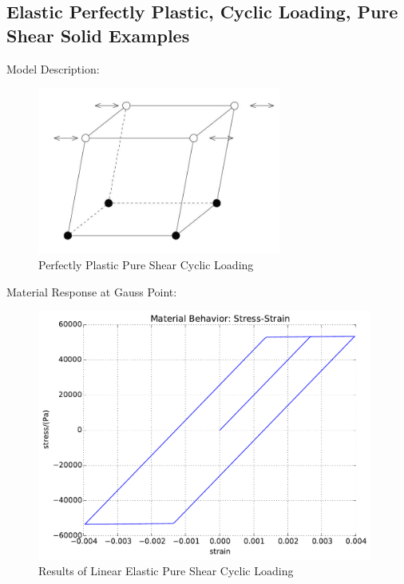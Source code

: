 \documentclass[fleqn,11pt]{article}
\begin{document}
\subsection{Elastic Perfectly Plastic, Cyclic Loading, Pure Shear Solid Examples}

Model Description:

\begin{figure}[H]
\begin{center}
\includegraphics[width=8cm]{../Figure-files/shear_cyclic_brick.JPG}
\caption{
\label{Perfectly Plastic Pure Shear Cyclic Loadin}
Perfectly Plastic Pure Shear Cyclic Loading}
\end{center}
\end{figure}

Material Response at Gauss Point:

\begin{figure}[H]
\begin{center}
\includegraphics[width=11cm]{../fei_examples/perfectly_plastic_pure_shear_solid/2pure_shear_cyclic_loading/result.pdf}
\caption{
\label{Results of Linear Elastic Pure Shear Cyclic Loadin}
Results of Linear Elastic Pure Shear Cyclic Loading}
\end{center}
\end{figure}
\end{document}
